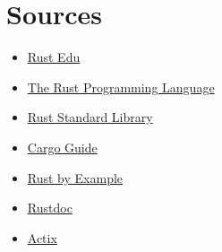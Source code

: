 \documentclass[a4paper,12pt]{article}
\begin{document}
	\section{Sources}
	\label{sec:Sources}
	\begin{itemize}
		\item \href{https://rust-edu.org/resources/}{Rust Edu}
		\item \href{https://doc.rust-lang.org/book/}{The Rust Programming Language}
		\item \href{https://doc.rust-lang.org/std/}{Rust Standard Library}
		\item \href{https://doc.rust-lang.org/cargo/}{Cargo Guide}
		\item \href{https://doc.rust-lang.org/rust-by-example/}{Rust by Example}
		\item \href{https://doc.rust-lang.org/rustdoc/}{Rustdoc}
		\item \href{https://actix.rs/}{Actix}
	\end{itemize}
	\printbibliography[title={Whole bibliography}]
\end{document}
